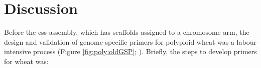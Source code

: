 

\section{Discussion}








Before the \gls{css} assembly, which has scaffolds assigned to a chromosome arm, the design and validation of genome-specific primers for polyploid wheat was a labour intensive process (Figure \ref{fig:poly:oldGSP}; \citealt{Akhunov2010}). 
Briefly, the steps to develop primers for wheat was: 

